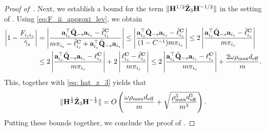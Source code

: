\documentclass[11pt,a4paper]{article}
\begin{document}
\begin{proof}[Proof of~]
Next,  we establish a bound for the term $ \|\mathbf{H}^{1/2}\check{\mathbf{Z}}_3\mathbf{H}^{-1/2}\|$ in the setting of .
Using \eqref{eq:F_ii_approxi_lev},  we obtain
    \begin{align}
   \left| 1-\frac{F_{i_si_s}}{\check \gamma_s}\right|&=\left | \frac{\mathbf{a}_{i_s}^\top \check{\mathbf{Q}}_{-s}\mathbf{a}_{i_s}-\check \ell^{\mathbf{C}}_{i_s}}{m\pi_{i_s}-\check \ell^{\mathbf{C}}_{i_s}+\mathbf{a}_{i_s}^\top \check{\mathbf{Q}}_{-s}\mathbf{a}_{i_s}}\right|\leq \left| \frac{\mathbf{a}_{i_s}^\top \check{\mathbf{Q}}_{-s}\mathbf{a}_{i_s}-\check \ell^{\mathbf{C}}_{i_s}}{(1-C^{-1})m\pi_{i_s}}\right|\leq 2\left| \frac{\mathbf{a}_{i_s}^\top \check{\mathbf{Q}}_{-s}\mathbf{a}_{i_s}-\check\ell^{\mathbf{C}}_{i_s}}{m\pi_{i_s}}\right|\nonumber\\
      &\leq 2\left| \frac{\mathbf{a}_{i_s}^\top \check{\mathbf{Q}}_{-s}\mathbf{a}_{i_s}-\ell^{\mathbf{C}}_{i_s}}{m\pi_{i_s}}\right|+2\left| \frac{\ell^{\mathbf{C}}_{i_s}-\check \ell^{\mathbf{C}}_{i_s}}{m\pi_{i_s}}\right|\leq2\left| \frac{\mathbf{a}_{i_s}^\top \check{\mathbf{Q}}_{-s}\mathbf{a}_{i_s}-\ell^{\mathbf{C}}_{i_s}}{m\pi_{i_s}}\right|+\frac{2\omega\rho_{\max} d_{\mathrm{eff}}}{m}.\nonumber
\end{align}
This, together with \eqref{eq: hat_z_3} yields that
\begin{align}
    \|\mathbf{H}^{\frac{1}{2}}\check{\mathbf{Z}}_3\mathbf{H}^{-\frac{1}{2}}\|
     = O\left(\frac{\omega\rho_{\max} d_{\mathrm{eff}}}{m}+\sqrt{\frac{\rho_{\max}^3 d^3_{\mathrm{eff}}}{m^3}}\right).\nonumber
\end{align}     
Putting these bounds together, we conclude the proof of .
\end{proof}
\end{document}
